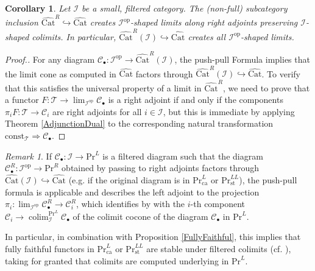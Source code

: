 \documentclass[a4paper,reqno,10pt]{amsart}
\newtheorem{corollary}[theorem]{Corollary}
\theoremstyle{definition}
\theoremstyle{remark}
\newtheorem{remark}[theorem]{Remark}
\newcommand{\br}[1]{\left(#1\right)}
\newcommand{\C}{\mathcal{C}}
\newcommand{\I}{\mathcal{I}}
\newcommand{\T}{\mathcal{T}}
\newcommand{\const}{\mathrm{const}}
\DeclareMathOperator*{\colim}{colim}
\newcommand{\Cat}{\mathrm{Cat}}
\renewcommand{\Pr}{\mathrm{Pr}}
\newcommand{\op}{\mathrm{op}}
\newcommand{\ca}{\mathrm{ca}}
\newcommand{\st}{\mathrm{st}}
\begin{document}
\begin{corollary}
Let $\I$ be a small, filtered category. The (non-full) subcategory inclusion $\widehat{\Cat}^R\hookrightarrow\widehat{\Cat}$ creates $\I^{\op}$-shaped limits along right adjoints preserving $\I$-shaped colimits. In particular, $\widehat{\Cat}^R(\I)\hookrightarrow\widehat{\Cat}$ creates all $\I^{\op}$-shaped limits.
\end{corollary}
\begin{proof}[Proof.]
For any diagram $\C_{\bullet}\colon\I^{\op}\rightarrow\widehat{\Cat}^R(\I)$, the push-pull Formula implies that the limit cone as computed in $\widehat{\Cat}$ factors through $\widehat{\Cat}^R(\I)\hookrightarrow\widehat{\Cat}$. To verify that this satisfies the universal property of a limit in $\widehat{\Cat}^R$, we need to prove that a functor $F\colon\T\rightarrow\lim_{\I^{\op}}\C_{\bullet}$ is a right adjoint if and only if the components $\pi_iF\colon\T\rightarrow\C_i$ are right adjoints for all $i\in\I$, but this is immediate by applying Theorem \ref{AdjunctionDual} to the corresponding natural transformation $\const_{\T}\Rightarrow\C_{\bullet}$.
\end{proof}

\begin{remark}\label{FilteredColimitPrL}
If $\C_{\bullet}\colon\I\rightarrow\Pr^L$ is a filtered diagram such that the diagram $\C_{\bullet}^R\colon\I^{\op}\rightarrow\Pr^R$ obtained by passing to right adjoints factors through $\widehat{\Cat}\br{\I}\hookrightarrow\widehat{\Cat}$ (e.g. if the original diagram is in $\Pr^L_{\ca}$ or $\Pr^{LL}_{\st}$), the push-pull formula is applicable and describes the left adjoint to the projection $\pi_i\colon\lim_{\I^{\op}}\C_{\bullet}^R\rightarrow\C_i^R$, which identifies by \cite[Corollary 5.5.3.4]{HTT} with the $i$-th component $\C_i\rightarrow\colim_{\I}^{\Pr^L}\C_{\bullet}$ of the colimit cocone of the diagram $\C_{\bullet}$ in $\Pr^L$.

In particular, in combination with Proposition \ref{FullyFaithful}, this implies that fully faithful functors in $\Pr^L_{\ca}$ or $\Pr^{LL}_{\st}$ are stable under filtered colimits (cf. \cite[Proposition 1.67]{Efimov}), taking for granted that colimits are computed underlying in $\Pr^L$.
\end{remark}
\end{document}
